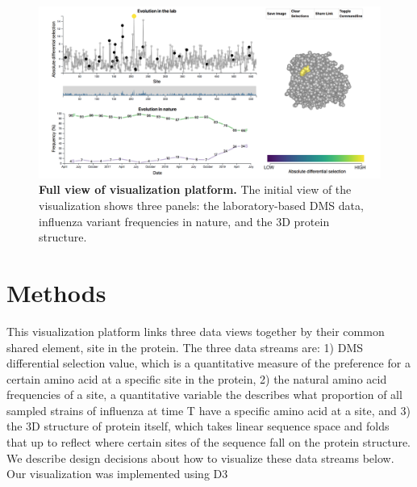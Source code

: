 \documentclass[sigchi, nonacm]{acmart}
\begin{document}
\begin{figure}[h]
	\includegraphics[width=\columnwidth]{viz-overview.png}
	\caption{\textbf{Full view of visualization platform.}
   The initial view of the visualization shows three panels: the laboratory-based DMS data, influenza variant frequencies in nature, and the 3D protein structure.
	}
	\label{overview}
\end{figure}

\section{Methods}

This visualization platform links three data views together by their common shared element, site in the protein.
The three data streams are: 1) DMS differential selection value, which is a quantitative measure of the preference for a certain amino acid at a specific site in the protein, 2) the natural amino acid frequencies of a site, a quantitative variable the describes what proportion of all sampled strains of influenza at time T have a specific amino acid at a site, and 3) the 3D structure of protein itself, which takes linear sequence space and folds that up to reflect where certain sites of the sequence fall on the protein structure.
We describe design decisions about how to visualize these data streams below.
Our visualization was implemented using D3 \cite{bostock2011d3}
\end{document}
